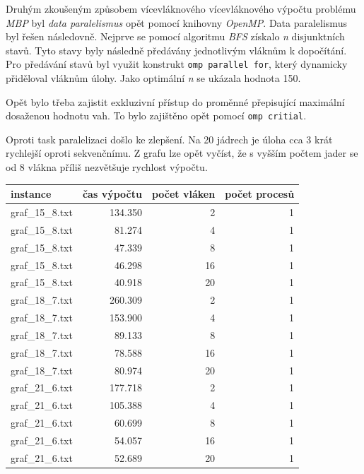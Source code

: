 Druhým zkoušeným způsobem vícevláknového vícevláknového výpočtu problému \textit{MBP} byl \textit{data paralelismus} opět pomocí knihovny \textit{OpenMP}.
Data paralelismus byl řešen následovně.
Nejprve se pomocí algoritmu \textit{BFS} získalo \textit{n} disjunktních stavů.
Tyto stavy byly následně předávány jednotlivým vláknům k dopočítání.
Pro předávání stavů byl využit konstrukt \verb|omp parallel for|, 
který dynamicky přiděloval vláknům úlohy.
Jako optimální \textit{n} se ukázala hodnota 150.

Opět bylo třeba zajistit exkluzivní přístup do proměnné přepisující maximální dosaženou hodnotu vah.
To bylo zajištěno opět pomocí \verb|omp critial|.

Oproti task paralelizaci došlo ke zlepšení.
Na 20 jádrech je úloha cca 3 krát rychlejší oproti sekvenčnímu.
Z grafu lze opět vyčíst, že s vyšším počtem jader se od 8 vlákna příliš nezvětšuje rychlost výpočtu.

\FloatBarrier
\begin{table}[]
    \begin{tabular}{l|rrr}
                    instance &    čas výpočtu &  počet vláken &  počet procesů \\
    \hline
    graf\_15\_8.txt & 134.350 &           2 &         1 \\
    graf\_15\_8.txt &  81.274 &           4 &         1 \\
    graf\_15\_8.txt &  47.339 &           8 &         1 \\
    graf\_15\_8.txt &  46.298 &          16 &         1 \\
    graf\_15\_8.txt &  40.918 &          20 &         1 \\
    graf\_18\_7.txt & 260.309 &           2 &         1 \\
    graf\_18\_7.txt & 153.900 &           4 &         1 \\
    graf\_18\_7.txt &  89.133 &           8 &         1 \\
    graf\_18\_7.txt &  78.588 &          16 &         1 \\
    graf\_18\_7.txt &  80.974 &          20 &         1 \\
    graf\_21\_6.txt & 177.718 &           2 &         1 \\
    graf\_21\_6.txt & 105.388 &           4 &         1 \\
    graf\_21\_6.txt &  60.699 &           8 &         1 \\
    graf\_21\_6.txt &  54.057 &          16 &         1 \\
    graf\_21\_6.txt &  52.689 &          20 &         1 \\
    \end{tabular}
\end{table}


